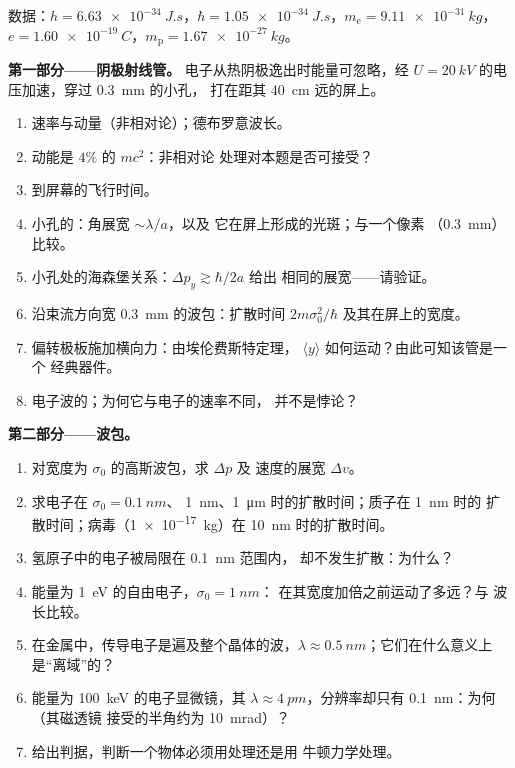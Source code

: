 \begin{problem}\label{pb:b2:schrodinger-wave-functions:1}
数据：$h = \qty{6.63e-34}{J.s}$，$\hbar = \qty{1.05e-34}{J.s}$，$m_{\text{e}} =
\qty{9.11e-31}{kg}$，$e = \qty{1.60e-19}{C}$，$m_{\text{p}} = \qty{1.67e-27}{kg}$。

\textbf{第一部分——阴极射线管。}
电子从热阴极逸出时能量可忽略，经
$U = \qty{20}{kV}$ 的电压加速，穿过 \qty{0.3}{mm} 的小孔，
打在距其 \qty{40}{cm} 远的屏上。
\begin{enumerate}
  \item 速率与动量（非相对论）；德布罗意波长。
  \item 动能是 $4\%$ 的 $mc^2$：非相对论
        处理对本题是否可接受？
  \item 到屏幕的飞行时间。
  \item 小孔的：角展宽 $\sim\lambda/a$，以及
        它在屏上形成的光斑；与一个像素
        （\qty{0.3}{mm}）比较。
  \item 小孔处的海森堡关系：$\Delta p_y \gtrsim \hbar/2a$ 给出
        相同的展宽——请验证。
  \item 沿束流方向宽 \qty{0.3}{mm} 的波包：扩散时间
        $2m\sigma_0^2/\hbar$ 及其在屏上的宽度。
  \item 偏转极板施加横向力：由埃伦费斯特定理，
        $\langle y\rangle$ 如何运动？由此可知该管是一个
        经典器件。
  \item 电子波的；为何它与电子的速率不同，
        并不是悖论？
\end{enumerate}

\textbf{第二部分——波包。}
\begin{enumerate}[resume]
  \item 对宽度为 $\sigma_0$ 的高斯波包，求 $\Delta p$ 及
        速度的展宽 $\Delta v$。
  \item 求电子在 $\sigma_0 = \qty{0.1}{nm}$、
        \qty{1}{nm}、\qty{1}{\micro m} 时的扩散时间；质子在 \qty{1}{nm} 时的
        扩散时间；病毒（\qty{1e-17}{kg}）在 \qty{10}{nm} 时的扩散时间。
  \item 氢原子中的电子被局限在 \qty{0.1}{nm} 范围内，
        却不发生扩散：为什么？
  \item 能量为 \qty{1}{eV} 的自由电子，$\sigma_0 = \qty{1}{nm}$：
        在其宽度加倍之前运动了多远？与
        波长比较。
  \item 在金属中，传导电子是遍及整个晶体的波，$\lambda \approx
        \qty{0.5}{nm}$；它们在什么意义上
        是“离域”的？
  \item 能量为 \qty{100}{keV} 的电子显微镜，其 $\lambda \approx
        \qty{4}{pm}$，分辨率却只有 \qty{0.1}{nm}：为何（其磁透镜
        接受的半角约为 \qty{10}{mrad}）？
  \item 给出判据，判断一个物体必须用处理还是用
        牛顿力学处理。
\end{enumerate}


\end{problem}
